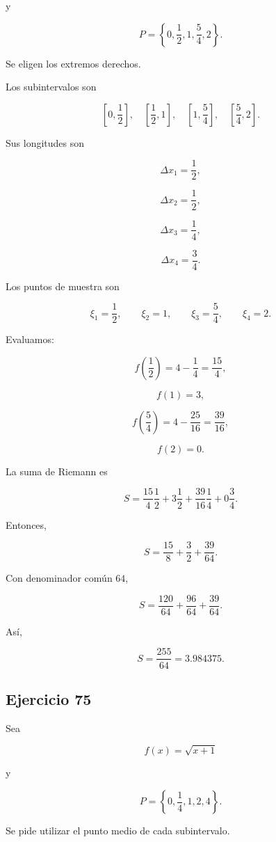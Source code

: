 \documentclass[12pt]{article}
\begin{document}
y

\[
P=
\left\{
0,\frac12,1,\frac54,2
\right\}.
\]

Se eligen los extremos derechos.

Los subintervalos son

\[
\left[0,\frac12\right],
\quad
\left[\frac12,1\right],
\quad
\left[1,\frac54\right],
\quad
\left[\frac54,2\right].
\]

Sus longitudes son

\[
\Delta x_1=\frac12,
\]

\[
\Delta x_2=\frac12,
\]

\[
\Delta x_3=\frac14,
\]

\[
\Delta x_4=\frac34.
\]

Los puntos de muestra son

\[
\xi_1=\frac12,
\qquad
\xi_2=1,
\qquad
\xi_3=\frac54,
\qquad
\xi_4=2.
\]

Evaluamos:

\[
f\left(\frac12\right)
=
4-\frac14
=
\frac{15}{4},
\]

\[
f(1)=3,
\]

\[
f\left(\frac54\right)
=
4-\frac{25}{16}
=
\frac{39}{16},
\]

\[
f(2)=0.
\]

La suma de Riemann es

\[
S
=
\frac{15}{4}\frac12
+
3\frac12
+
\frac{39}{16}\frac14
+
0\frac34.
\]

Entonces,

\[
S
=
\frac{15}{8}
+
\frac32
+
\frac{39}{64}.
\]

Con denominador común \(64\),

\[
S
=
\frac{120}{64}
+
\frac{96}{64}
+
\frac{39}{64}.
\]

Así,

\[
\boxed{
S=\frac{255}{64}=3.984375
}.
\]

\subsection*{Ejercicio 75}

Sea

\[
f(x)=\sqrt{x+1}
\]

y

\[
P=
\left\{
0,\frac14,1,2,4
\right\}.
\]

Se pide utilizar el punto medio de cada subintervalo.
\end{document}
